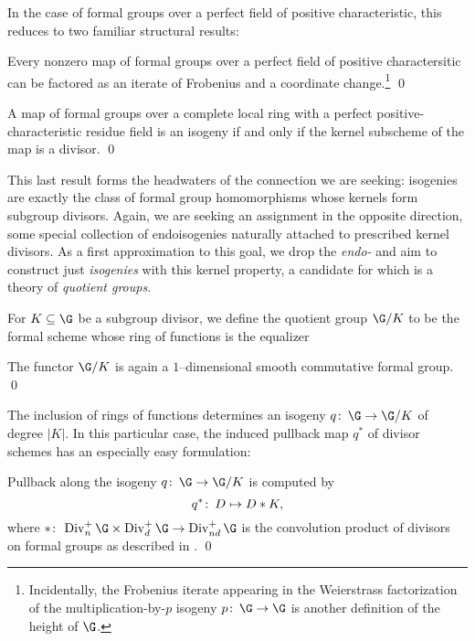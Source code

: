\noindent In the case of formal groups over a perfect field of positive characteristic, this reduces to two familiar structural results:

\begin{corollary}
Every nonzero map of formal groups over a perfect field of positive charactersitic can be factored as an iterate of Frobenius and a coordinate change.\footnote{Incidentally, the Frobenius iterate appearing in the Weierstrass factorization of the multiplication-by-$p$ isogeny $p\co \G \to \G$ is another definition of the height of $\G$.} \qed
\end{corollary}

\begin{corollary}
A map of formal groups over a complete local ring with a perfect positive-characteristic residue field is an isogeny if and only if the kernel subscheme of the map is a divisor. \qed
\end{corollary}

This last result forms the headwaters of the connection we are seeking: isogenies are exactly the class of formal group homomorphisms whose kernels form subgroup divisors.  Again, we are seeking an assignment in the opposite direction, some special collection of endoisogenies naturally attached to prescribed kernel divisors.  As a first approximation to this goal, we drop the \emph{endo-} and aim to construct just \emph{isogenies} with this kernel property, a candidate for which is a theory of \textit{quotient groups}.

\begin{definition}
For $K \subseteq \G$ be a subgroup divisor, we define the quotient group $\G/K$ to be the formal scheme whose ring of functions is the equalizer
\begin{center}
\end{center}
\end{definition}

\begin{lemma}
The functor $\G/K$ is again a $1$--dimensional smooth commutative formal group. \qed
\end{lemma}

The inclusion of rings of functions determines an isogeny $q\co \G \to \G/K$ of degree $|K|$.  In this particular case, the induced pullback map $q^*$ of divisor schemes has an especially easy formulation:
\begin{lemma}
Pullback along the isogeny $q\co \G \to \G/K$ is computed by \[q^* \colon\thinspace D \mapsto D * K,\] where $*\co \Div_n^+ \G \times \Div_d^+ \G \to \Div_{nd}^+ \G$ is the convolution product of divisors on formal groups as described in . \qed
\end{lemma}

